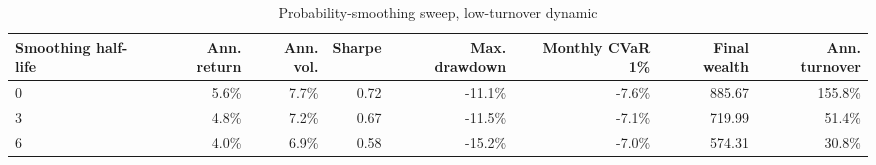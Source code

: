 \begin{table}[!htbp]
\centering
\caption{Probability-smoothing sweep, low-turnover dynamic}
\label{tab:allocation-smoothing-low-turnover}
\small
\setlength{\tabcolsep}{5pt}
\renewcommand{\arraystretch}{1.12}
\begin{adjustbox}{center,max width=\linewidth}
\begin{tabular}{lrrrrrrr}
\toprule
Smoothing half-life & Ann. return & Ann. vol. & Sharpe & Max. drawdown & Monthly CVaR 1\% & Final wealth & Ann. turnover \\
\midrule
0 & 5.6\% & 7.7\% & 0.72 & -11.1\% & -7.6\% & 885.67 & 155.8\% \\
3 & 4.8\% & 7.2\% & 0.67 & -11.5\% & -7.1\% & 719.99 & 51.4\% \\
6 & 4.0\% & 6.9\% & 0.58 & -15.2\% & -7.0\% & 574.31 & 30.8\% \\
\bottomrule
\end{tabular}
\end{adjustbox}
\end{table}